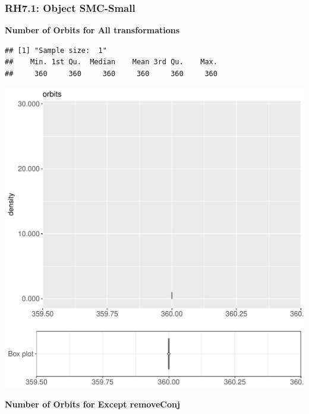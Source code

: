 \documentclass{article}\usepackage[]{graphicx}\usepackage[]{color}
\makeatletter
\def\maxwidth{ %
  \ifdim\Gin@nat@width>\linewidth
    \linewidth
  \else
    \Gin@nat@width
  \fi
}
\newenvironment{kframe}{%
 \def\at@end@of@kframe{}%
 \ifinner\ifhmode%
  \def\at@end@of@kframe{\end{minipage}}%
  \begin{minipage}{\columnwidth}%
 \fi\fi%
 \def\FrameCommand##1{\hskip\@totalleftmargin \hskip-\fboxsep
 \colorbox{shadecolor}{##1}\hskip-\fboxsep
     \hskip-\linewidth \hskip-\@totalleftmargin \hskip\columnwidth}%
 \MakeFramed {\advance\hsize-\width
   \@totalleftmargin\z@ \linewidth\hsize
   \@setminipage}}%
 {\par\unskip\endMakeFramed%
 \at@end@of@kframe}
\newenvironment{knitrout}{}{} %
\makeatother
\begin{document}
\subsubsection{RH7.1: Object SMC-Small}

 \textbf{Number of Orbits for All transformations}
\begin{knitrout}
\color{fgcolor}\begin{kframe}
\begin{verbatim}
## [1] "Sample size:  1"
##    Min. 1st Qu.  Median    Mean 3rd Qu.    Max. 
##     360     360     360     360     360     360
\end{verbatim}


{\ttfamily\noindent\bfseries{}}\end{kframe}
\includegraphics[width=\maxwidth]{figure/RH7_cashew_small-1} 

\end{knitrout}
 \textbf{Number of Orbits for Except removeConj}
\end{document}
